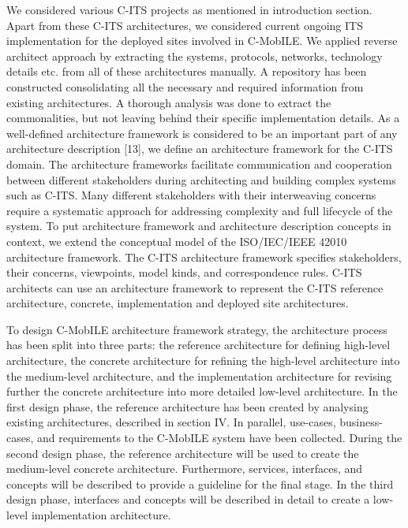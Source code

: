 \documentclass[conference]{IEEEtran}
\begin{document}
We considered various C-ITS projects as mentioned in introduction section. Apart from these C-ITS architectures, we considered current ongoing ITS implementation for the deployed sites involved in C-MobILE. We applied reverse architect approach by extracting the systems, protocols, networks, technology details etc. from all of these architectures manually.  A repository has been constructed consolidating all the necessary and required information from existing architectures. A thorough analysis was done to extract the commonalities, but not leaving behind their specific implementation details. As a well-defined architecture framework is considered to be an important part of any architecture description [13], we define an architecture framework for the C-ITS domain. The architecture frameworks facilitate communication and cooperation between different stakeholders during architecting and building complex systems such as C-ITS. Many different stakeholders with their interweaving concerns require a systematic approach for addressing complexity and full lifecycle of the system. To put architecture framework and architecture description concepts in context, we extend the conceptual model of the ISO/IEC/IEEE 42010 architecture framework. The C-ITS architecture framework specifies stakeholders, their concerns, viewpoints, model kinds, and correspondence rules. C-ITS architects can use an architecture framework to represent the C-ITS reference architecture, concrete, implementation and deployed site architectures. 

To design C-MobILE architecture framework strategy, the architecture process has been split into three parts: the reference architecture for defining high-level architecture, the concrete architecture for refining the high-level architecture into the medium-level architecture, and the implementation architecture for revising further the concrete architecture into more detailed low-level architecture. In the first design phase, the reference architecture has been created by analysing existing architectures, described in section IV. In parallel, use-cases, business-cases, and requirements to the C-MobILE system have been collected. During the second design phase, the reference architecture will be used to create the medium-level concrete architecture. Furthermore, services, interfaces, and concepts will be described to provide a guideline for the final stage. In the third design phase, interfaces and concepts will be described in detail to create a low-level implementation architecture.
\end{document}
